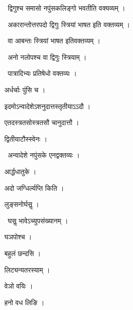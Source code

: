 \documentclass[10pt, openany, oneside]{book}
\begin{document}
\par\noindent\hspace{1.5em}{\vps वा॰}~{\qt द्विगुश्च समासो नपुंसकलिङ्गो भवतीति वक्यव्यम् ।}

\par\noindent\hspace{1.5em}{\vps वा॰}~{\qt अकारान्तोत्तरपदो द्विगुः स्त्रियां भाषत इति वक्तव्यम् ।}

\par\noindent\hspace{1.5em}{\vps वा॰}~{\qt वा आबन्तः स्त्रियां भाषत इतिवक्तव्यम् ।}

\par\noindent\hspace{1.5em}{\vps वा॰}~{\qt अनो नलोपश्च वा द्विगुः स्त्रियाम् ।}

\par\noindent\hspace{1.5em}{\vps वा॰}~{\qt पात्रादिभ्यः प्रतिषेधो वक्तव्यः ।}

\noindent अर्धर्चाः पुंसि च ।

\noindent इदमोऽन्वादेशेऽशनुदात्तस्तृतीयाऽऽदौ ।

\noindent एतदस्त्रतसोस्त्रतसौ चानुदात्तौ ।

\noindent द्वितीयाटौस्स्वेनः ।

\par\noindent\hspace{1.5em}{\vps वा॰}~{\qt अन्वादेशे नपुंसके एनद्वक्तव्यः ।}

\noindent आर्द्धधातुके ।

\noindent अदो जग्धिर्ल्यप्ति किति ।

\noindent लुङ्सनोर्घसॢ ।

\par\noindent\hspace{1.5em}{\vps वा॰}~{\qt घसॢ भावेऽच्युपसंख्यानम् ।}

\noindent घञपोश्च ।

\noindent बहुलं छन्दसि ।

\noindent लिट्यन्यतरस्याम् ।

\noindent वेञो वयिः ।

\noindent हनो वध लिङि ।
\end{document}
